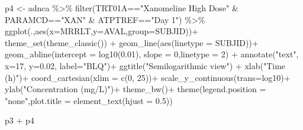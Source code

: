 \documentclass[
  letterpaper,
  DIV=11,
  numbers=noendperiod]{scrreprt}
\newenvironment{Shaded}{\begin{snugshade}}{\end{snugshade}}
\newcommand{\AttributeTok}[1]{\textcolor[rgb]{0.40,0.45,0.13}{#1}}
\newcommand{\DecValTok}[1]{\textcolor[rgb]{0.68,0.00,0.00}{#1}}
\newcommand{\FloatTok}[1]{\textcolor[rgb]{0.68,0.00,0.00}{#1}}
\newcommand{\FunctionTok}[1]{\textcolor[rgb]{0.28,0.35,0.67}{#1}}
\newcommand{\NormalTok}[1]{\textcolor[rgb]{0.00,0.23,0.31}{#1}}
\newcommand{\OtherTok}[1]{\textcolor[rgb]{0.00,0.23,0.31}{#1}}
\newcommand{\SpecialCharTok}[1]{\textcolor[rgb]{0.37,0.37,0.37}{#1}}
\newcommand{\StringTok}[1]{\textcolor[rgb]{0.13,0.47,0.30}{#1}}
\begin{document}
\begin{Shaded}
\begin{Highlighting}[]
\NormalTok{p4 }\OtherTok{\textless{}{-}}\NormalTok{ adnca }\SpecialCharTok{\%\textgreater{}\%} 
  \FunctionTok{filter}\NormalTok{(TRT01A}\SpecialCharTok{==}\StringTok{"Xanomeline High Dose"} \SpecialCharTok{\&} 
\NormalTok{        PARAMCD}\SpecialCharTok{==}\StringTok{"XAN"} \SpecialCharTok{\&}\NormalTok{ ATPTREF}\SpecialCharTok{==}\StringTok{"Day 1"}\NormalTok{) }\SpecialCharTok{\%\textgreater{}\%}
  \FunctionTok{ggplot}\NormalTok{(.,}\FunctionTok{aes}\NormalTok{(}\AttributeTok{x=}\NormalTok{MRRLT,}\AttributeTok{y=}\NormalTok{AVAL,}\AttributeTok{group=}\NormalTok{SUBJID))}\SpecialCharTok{+}
  \FunctionTok{theme\_set}\NormalTok{(}\FunctionTok{theme\_classic}\NormalTok{()) }\SpecialCharTok{+}
  \FunctionTok{geom\_line}\NormalTok{(}\FunctionTok{aes}\NormalTok{(}\AttributeTok{linetype =}\NormalTok{ SUBJID))}\SpecialCharTok{+}
  \FunctionTok{geom\_abline}\NormalTok{(}\AttributeTok{intercept =} \FunctionTok{log10}\NormalTok{(}\FloatTok{0.01}\NormalTok{), }\AttributeTok{slope =} \DecValTok{0}\NormalTok{,}\AttributeTok{linetype =} \DecValTok{2}\NormalTok{) }\SpecialCharTok{+}
  \FunctionTok{annotate}\NormalTok{(}\StringTok{"text"}\NormalTok{, }\AttributeTok{x=}\DecValTok{17}\NormalTok{, }\AttributeTok{y=}\FloatTok{0.02}\NormalTok{, }\AttributeTok{label=}\StringTok{"BLQ"}\NormalTok{)}\SpecialCharTok{+}
  \FunctionTok{ggtitle}\NormalTok{(}\StringTok{"Semilogarithmic view"}\NormalTok{) }\SpecialCharTok{+}
  \FunctionTok{xlab}\NormalTok{(}\StringTok{"Time (h)"}\NormalTok{)}\SpecialCharTok{+}
  \FunctionTok{coord\_cartesian}\NormalTok{(}\AttributeTok{xlim =} \FunctionTok{c}\NormalTok{(}\DecValTok{0}\NormalTok{, }\DecValTok{25}\NormalTok{))}\SpecialCharTok{+}
  \FunctionTok{scale\_y\_continuous}\NormalTok{(}\AttributeTok{trans=}\StringTok{\textquotesingle{}log10\textquotesingle{}}\NormalTok{)}\SpecialCharTok{+}
  \FunctionTok{ylab}\NormalTok{(}\StringTok{"Concentration (mg/L)"}\NormalTok{)}\SpecialCharTok{+}
  \FunctionTok{theme\_bw}\NormalTok{()}\SpecialCharTok{+} 
  \FunctionTok{theme}\NormalTok{(}\AttributeTok{legend.position =} \StringTok{"none"}\NormalTok{,}\AttributeTok{plot.title =} \FunctionTok{element\_text}\NormalTok{(}\AttributeTok{hjust =} \FloatTok{0.5}\NormalTok{)) }

\NormalTok{p3 }\SpecialCharTok{+}\NormalTok{ p4}
\end{Highlighting}
\end{Shaded}
\end{document}
